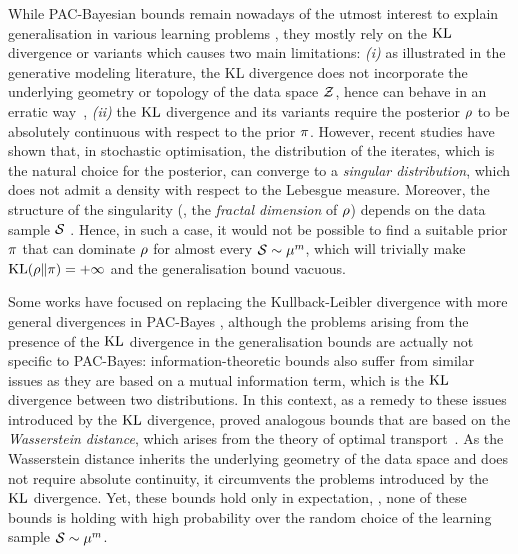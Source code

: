 \documentclass{article}
\begin{document}
While PAC-Bayesian bounds remain nowadays of the utmost interest to explain generalisation in various learning problems 
\citep{letarte2019dichotomize,mhammedi2019pac,nozawa2019pac,mhammedi2020pac,biggs2020differentiable,haddouche2021pac,zantedeschi2021learning,biggs2021margins,biggs2022vacuous,biggs2022margins,cherief2021pac,lotfi2022pac,flynn2022pac,biggs2022tighter,sakhi2022pac,riou2023bayes}, they mostly rely on the $\KL$ divergence or variants which causes two main limitations: {\it (i)} as illustrated in the generative modeling literature, the KL divergence does not incorporate the underlying geometry or topology of the data space $\Z$, hence can behave in an erratic way~\citep{arjovsky2017wasserstein},
{\it (ii)} the $\KL$ divergence and its variants require the posterior $\Q$ to be absolutely continuous with respect to the prior $\P$.
However, recent studies \citep{camuto2021fractal} have shown that, in stochastic optimisation, the distribution of the iterates, which is the natural choice for the posterior, can converge to a \emph{singular distribution}, which does not admit a density with respect to the Lebesgue measure.
Moreover, the structure of the singularity (\ie, the \emph{fractal dimension} of $\Q$) depends on the data sample $\S$ \citep{camuto2021fractal}. 
Hence, in such a case, it would not be possible to find a suitable prior $\P$ that can dominate $\Q$ for almost every $\S \sim \D^m$, which will trivially make $\KL(\Q\|\P) = +\infty$ and the generalisation bound vacuous. 

Some works have focused on replacing the Kullback-Leibler divergence with more general divergences in PAC-Bayes \citep{alquier2018simpler,ohnishi2021novel,picard2022change}, although the problems arising from the presence of the $\KL$ divergence in the generalisation bounds are actually not specific to PAC-Bayes: information-theoretic bounds \citep{goyal2017pac,xu2017information,russo2020how} also suffer from similar issues as they are based on a mutual information term, which is the $\KL$ divergence between two distributions.
In this context, as a remedy to these issues introduced by the $\KL$ divergence, \cite{zhang2018optimal,wang2019information,rodriguez2021tighter,lugosi2022generalization} proved analogous bounds that are based on the \emph{Wasserstein distance}, which arises from the theory of optimal transport~\cite{monge1781memoire}.
As the Wasserstein distance inherits the underlying geometry of the data space and does not require absolute continuity, it circumvents the problems introduced by the $\KL$ divergence.
Yet, these bounds hold only in expectation, \ie, none of these bounds is holding with high probability over the random choice of the learning sample $\S\sim\D^{m}$.
\end{document}
